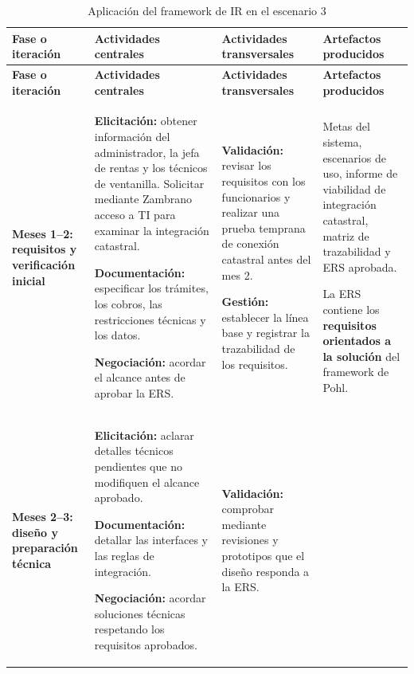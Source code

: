 \documentclass[12pt,a4paper]{article}
\begin{document}
\begin{longtable}{
>{\raggedright\arraybackslash}p{2.3cm}
>{\raggedright\arraybackslash}p{4.2cm}
>{\raggedright\arraybackslash}p{4.2cm}
>{\raggedright\arraybackslash}p{4.2cm}
}

\caption{Aplicación del framework de IR en el escenario 3}\\
\toprule
\textbf{Fase o iteración} &
\textbf{Actividades centrales} &
\textbf{Actividades transversales} &
\textbf{Artefactos producidos} \\
\midrule
\endfirsthead

\toprule
\textbf{Fase o iteración} &
\textbf{Actividades centrales} &
\textbf{Actividades transversales} &
\textbf{Artefactos producidos} \\
\midrule
\endhead

\textbf{Meses 1--2: requisitos y verificación inicial} &
\textbf{Elicitación:} obtener información del administrador,
la jefa de rentas y los técnicos de ventanilla.
Solicitar mediante Zambrano acceso a TI para
examinar la integración catastral.

\par\medskip
\textbf{Documentación:} especificar los trámites,
los cobros, las restricciones técnicas y los datos.

\par\medskip
\textbf{Negociación:} acordar el alcance antes
de aprobar la ERS. &
\textbf{Validación:} revisar los requisitos con
los funcionarios y realizar una prueba temprana
de conexión catastral antes del mes 2.

\par\medskip
\textbf{Gestión:} establecer la línea base
y registrar la trazabilidad de los requisitos. &
Metas del sistema, escenarios de uso, informe
de viabilidad de integración catastral,
matriz de trazabilidad y ERS aprobada.

La ERS contiene los \textbf{requisitos orientados
a la solución} del framework de Pohl. \\
\midrule

\textbf{Meses 2--3: diseño y preparación técnica} &
\textbf{Elicitación:} aclarar detalles técnicos
pendientes que no modifiquen el alcance aprobado.

\par\medskip
\textbf{Documentación:} detallar las interfaces
y las reglas de integración.

\par\medskip
\textbf{Negociación:} acordar soluciones técnicas
respetando los requisitos aprobados. &
\textbf{Validación:} comprobar mediante revisiones
y prototipos que el diseño responda a la ERS.


\end{longtable}
\end{document}
